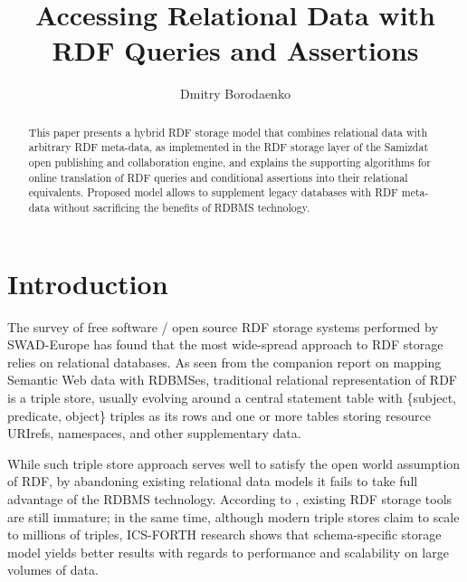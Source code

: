 \documentclass{llncs}
\begin{document}
\mainmatter              %
%
\title{Accessing Relational Data with RDF Queries and Assertions}
%
\author{Dmitry Borodaenko}
%

\maketitle              %

\begin{abstract}
This paper presents a hybrid RDF storage model that combines relational data
with arbitrary RDF meta-data, as implemented in the RDF storage layer of the
Samizdat open publishing and collaboration engine, and explains the supporting
algorithms for online translation of RDF queries and conditional assertions
into their relational equivalents. Proposed model allows to supplement legacy
databases with RDF meta-data without sacrificing the benefits of RDBMS
technology.
\end{abstract}


\section{Introduction}

The survey of free software / open source RDF storage systems performed by
SWAD-Europe\cite{swad-storage} has found that the most wide-spread approach to
RDF storage relies on relational databases. As seen from the companion report
on mapping Semantic Web data with RDBMSes\cite{swad-rdbms-mapping},
traditional relational representation of RDF is a triple store, usually
evolving around a central statement table with \{subject, predicate, object\}
triples as its rows and one or more tables storing resource URIrefs,
namespaces, and other supplementary data.

While such triple store approach serves well to satisfy the open world
assumption of RDF, by abandoning existing relational data models it fails to
take full advantage of the RDBMS technology. According to \cite{swad-storage},
existing RDF storage tools are still immature; in the same time, although
modern triple stores claim to scale to millions of triples, ICS-FORTH
research\cite{ics-volume} shows that schema-specific storage model yields
better results with regards to performance and scalability on large volumes of
data.
\end{document}
